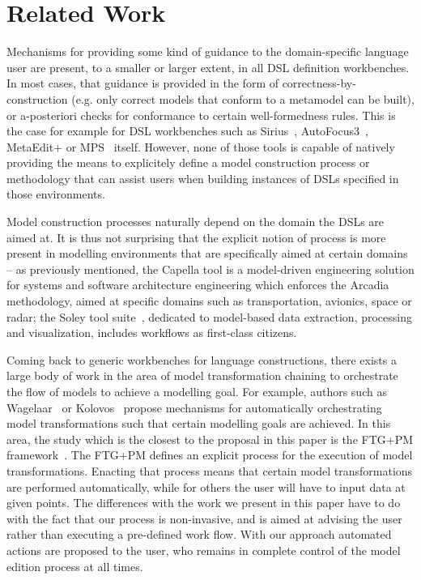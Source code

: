 \vspace{-.1cm}
\section{Related Work}
\label{sec:related_work}
 \vspace{-.4cm}
Mechanisms for providing some kind of guidance to the domain-specific
language user are present, to a smaller or larger extent, in all DSL definition
workbenches. In most cases, that guidance is provided in the form of
correctness-by-construction (e.g. only correct models that conform to a
metamodel can be built), or a-posteriori checks for conformance to certain
well-formedness rules. This is the case for example for DSL workbenches such as
Sirius~\cite{DBLP:conf/asplos/HauswaldLZLRKDM15}, AutoFocus3~\cite{AF315},
MetaEdit+\cite{DBLP:conf/sle/Tolvanen16} or MPS~\cite{DBLP:conf/pppj/PechSV13}
itself. However, none of those tools is capable of natively providing the means
to explicitely define a model construction process or methodology that can
assist users when building instances of DSLs specified in those environments.

Model construction processes naturally depend on the domain the DSLs are aimed
at. It is thus not surprising that the explicit notion of process is more
present in modelling environments that are specifically aimed at certain domains
-- as previously mentioned, the Capella tool is a model-driven engineering
solution for systems and software architecture engineering which enforces the
Arcadia~\cite{DBLP:conf/syscon/BonnetVEN16} methodology, aimed at specific
domains such as transportation, avionics, space or radar; the Soley tool
suite~\cite{soley}, dedicated to model-based data extraction, processing and
visualization, includes workflows as first-class citizens.

Coming back to generic workbenches for language constructions, there exists a
large body of work in the area of model transformation chaining to orchestrate
the flow of models to achieve a modelling goal. For example, authors such as
Wagelaar~\cite{wagelaar2006blackbox}  or Kolovos~\cite{Kolovos2008} propose
mechanisms for automatically orchestrating model transformations such that
certain modelling goals are achieved. In this area, the study which is the
closest to the proposal in this paper is the FTG+PM
framework~\cite{DBLP:conf/sdl/LucioMDVJ13,MustafizDLV12}. The FTG+PM defines an
explicit process for the execution of model transformations.
Enacting that process means that certain model transformations are performed
automatically, while for others the user will have to input data at given
points. The differences with the work we present in this paper have to do with
the fact that our process is non-invasive, and is aimed at advising the user
rather than executing a pre-defined work flow. With our approach automated
actions are proposed to the user, who remains in complete control of the model
edition process at all times.

